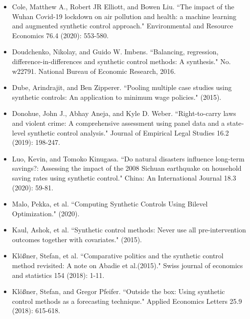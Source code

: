 \documentclass[12pt,a4paper,draft]{article}
\begin{document}
\begin{itemize}
    \item Cole, Matthew A., Robert JR Elliott, and Bowen Liu. ``The impact of the Wuhan Covid-19 lockdown on air pollution and health: a machine learning and augmented synthetic control approach." Environmental and Resource Economics 76.4 (2020): 553-580.
    \item Doudchenko, Nikolay, and Guido W. Imbens. ``Balancing, regression, difference-in-differences and synthetic control methods: A synthesis." No. w22791. National Bureau of Economic Research, 2016.
    \item Dube, Arindrajit, and Ben Zipperer. ``Pooling multiple case studies using synthetic controls: An application to minimum wage policies." (2015).
    \item Donohue, John J., Abhay Aneja, and Kyle D. Weber. ``Right-to-carry laws and violent crime: A comprehensive assessment using panel data and a state‐level synthetic control analysis." Journal of Empirical Legal Studies 16.2 (2019): 198-247.
    \item Luo, Kevin, and Tomoko Kinugasa. ``Do natural disasters influence long-term savings?: Assessing the impact of the 2008 Sichuan earthquake on household saving rates using synthetic control." China: An International Journal 18.3 (2020): 59-81.
    \item Malo, Pekka, et al. ``Computing Synthetic Controls Using Bilevel Optimization." (2020).
    \item Kaul, Ashok, et al. ``Synthetic control methods: Never use all pre-intervention outcomes together with covariates." (2015).
    \item Klößner, Stefan, et al. ``Comparative politics and the synthetic control method revisited: A note on Abadie et al.(2015)." Swiss journal of economics and statistics 154 (2018): 1-11.
    \item Klößner, Stefan, and Gregor Pfeifer. ``Outside the box: Using synthetic control methods as a forecasting technique." Applied Economics Letters 25.9 (2018): 615-618.
\end{itemize}
\end{document}
